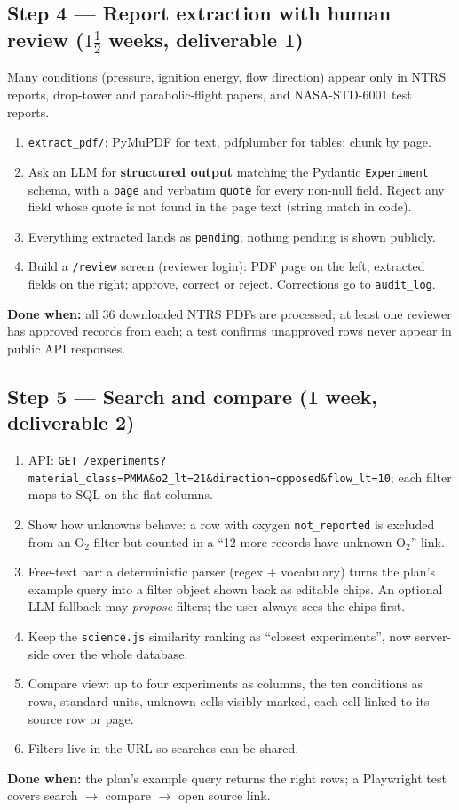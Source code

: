 \documentclass[11pt,a4paper]{article}
\newcommand{\Otwo}{\ensuremath{\mathrm{O_2}}}
\newcommand{\code}[1]{\texttt{#1}}
\newcommand{\done}[1]{\begin{donebox}\textbf{Done when:} #1\end{donebox}}
\begin{document}
\subsection{Step 4 --- Report extraction with human review \hfill\normalfont\small ($1\tfrac{1}{2}$ weeks, deliverable 1)}
Many conditions (pressure, ignition energy, flow direction) appear only in NTRS reports, drop-tower and parabolic-flight papers, and NASA-STD-6001 test reports.
\begin{enumerate}
  \item \code{extract\_pdf/}: PyMuPDF for text, pdfplumber for tables; chunk by page.
  \item Ask an LLM for \textbf{structured output} matching the Pydantic \code{Experiment} schema, with a \code{page} and verbatim \code{quote} for every non-null field. Reject any field whose quote is not found in the page text (string match in code).
  \item Everything extracted lands as \code{pending}; nothing pending is shown publicly.
  \item Build a \code{/review} screen (reviewer login): PDF page on the left, extracted fields on the right; approve, correct or reject. Corrections go to \code{audit\_log}.
\end{enumerate}
\done{all 36 downloaded NTRS PDFs are processed; at least one reviewer has approved records from each; a test confirms unapproved rows never appear in public API responses.}

\subsection{Step 5 --- Search and compare \hfill\normalfont\small (1 week, deliverable 2)}
\begin{enumerate}
  \item API: \code{GET /experiments?material\_class=PMMA\&o2\_lt=21\&direction=opposed\&flow\_lt=10}; each filter maps to SQL on the flat columns.
  \item Show how unknowns behave: a row with oxygen \code{not\_reported} is excluded from an \Otwo{} filter but counted in a ``12 more records have unknown \Otwo'' link.
  \item Free-text bar: a deterministic parser (regex + vocabulary) turns the plan's example query into a filter object shown back as editable chips. An optional LLM fallback may \emph{propose} filters; the user always sees the chips first.
  \item Keep the \code{science.js} similarity ranking as ``closest experiments'', now server-side over the whole database.
  \item Compare view: up to four experiments as columns, the ten conditions as rows, standard units, unknown cells visibly marked, each cell linked to its source row or page.
  \item Filters live in the URL so searches can be shared.
\end{enumerate}
\done{the plan's example query returns the right rows; a Playwright test covers search $\rightarrow$ compare $\rightarrow$ open source link.}
\end{document}
